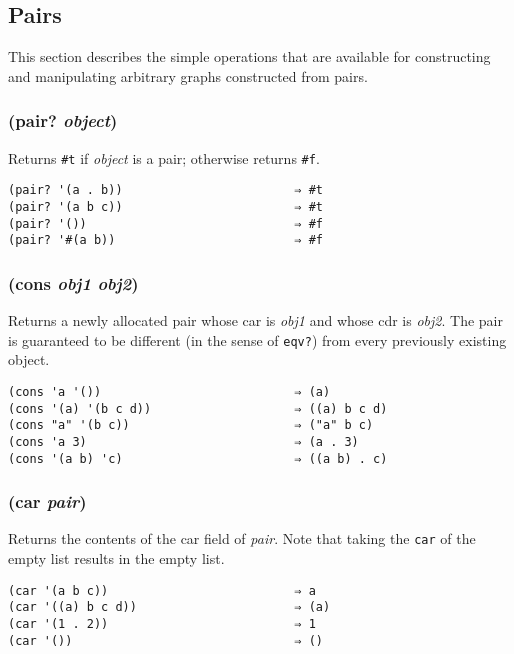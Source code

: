 \documentclass{article}
\begin{document}
\subsection{Pairs}\label{sec:pairs}

This section describes the simple operations that are available for constructing and
manipulating arbitrary graphs constructed from pairs.

\subsubsection{(pair? \emph{object})}

Returns \verb|#t| if \emph{object} is a pair; otherwise returns \verb|#f|.

\begin{verbatim}
(pair? '(a . b))                        ⇒ #t
(pair? '(a b c))                        ⇒ #t
(pair? '())                             ⇒ #f
(pair? '#(a b))                         ⇒ #f
\end{verbatim}

\subsubsection{(cons \emph{obj1} \emph{obj2})}

Returns a newly allocated pair whose car is \emph{obj1} and whose cdr is \emph{obj2}. The pair
is guaranteed to be different (in the sense of \verb|eqv?|) from every previously existing
object.

\begin{verbatim}
(cons 'a '())                           ⇒ (a)
(cons '(a) '(b c d))                    ⇒ ((a) b c d)
(cons "a" '(b c))                       ⇒ ("a" b c)
(cons 'a 3)                             ⇒ (a . 3)
(cons '(a b) 'c)                        ⇒ ((a b) . c)
\end{verbatim}

\subsubsection{(car \emph{pair})}

Returns the contents of the car field of \emph{pair}. Note that taking the \verb|car| of the
empty list results in the empty list.

\begin{verbatim}
(car '(a b c))                          ⇒ a
(car '((a) b c d))                      ⇒ (a)
(car '(1 . 2))                          ⇒ 1
(car '())                               ⇒ ()
\end{verbatim}
\end{document}
